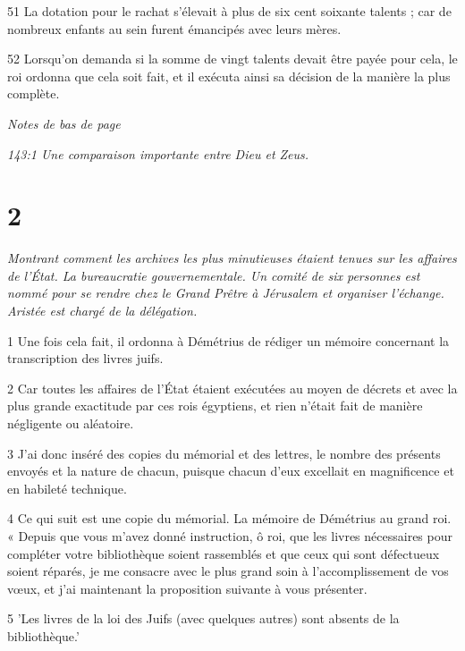 \par 51 La dotation pour le rachat s'élevait à plus de six cent soixante talents ; car de nombreux enfants au sein furent émancipés avec leurs mères.

\par 52 Lorsqu'on demanda si la somme de vingt talents devait être payée pour cela, le roi ordonna que cela soit fait, et il exécuta ainsi sa décision de la manière la plus complète.

\par \textit{Notes de bas de page}
\par \textit{143:1 Une comparaison importante entre Dieu et Zeus.}

\chapter{2}

\par \textit{Montrant comment les archives les plus minutieuses étaient tenues sur les affaires de l'État. La bureaucratie gouvernementale. Un comité de six personnes est nommé pour se rendre chez le Grand Prêtre à Jérusalem et organiser l'échange. Aristée est chargé de la délégation.}

\par 1 Une fois cela fait, il ordonna à Démétrius de rédiger un mémoire concernant la transcription des livres juifs.

\par 2 Car toutes les affaires de l'État étaient exécutées au moyen de décrets et avec la plus grande exactitude par ces rois égyptiens, et rien n'était fait de manière négligente ou aléatoire.

\par 3 J'ai donc inséré des copies du mémorial et des lettres, le nombre des présents envoyés et la nature de chacun, puisque chacun d'eux excellait en magnificence et en habileté technique.

\par 4 Ce qui suit est une copie du mémorial. La mémoire de Démétrius au grand roi. « Depuis que vous m'avez donné instruction, ô roi, que les livres nécessaires pour compléter votre bibliothèque soient rassemblés et que ceux qui sont défectueux soient réparés, je me consacre avec le plus grand soin à l'accomplissement de vos vœux, et j'ai maintenant la proposition suivante à vous présenter.

\par 5 'Les livres de la loi des Juifs (avec quelques autres) sont absents de la bibliothèque.'

